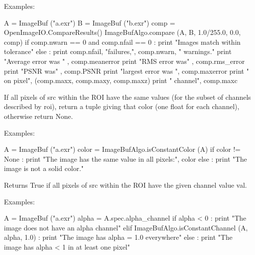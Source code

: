 \smallskip
\noindent Examples:
\begin{code}
    A = ImageBuf ("a.exr")
    B = ImageBuf ("b.exr")
    comp = OpenImageIO.CompareResults()
    ImageBufAlgo.compare (A, B, 1.0/255.0, 0.0, comp)
    if comp.nwarn == 0 and comp.nfail == 0 :
        print "Images match within tolerance"
    else :
        print comp.nfail, "failures,", comp.nwarn, " warnings."
        print "Average error was " , comp.meanerror
        print "RMS error was" , comp.rms_error
        print "PSNR was" , comp.PSNR
        print "largest error was ", comp.maxerror
        print "  on pixel", (comp.maxx, comp.maxy, comp.maxz)
        print "  channel", comp.maxc
\end{code}
\apiend


 

If all pixels of {\cf src} within the ROI have the same values (for the
subset of channels described by {\cf roi}), return a tuple giving that
color (one {\cf float} for each channel), otherwise return {\cf None}.

\smallskip
\noindent Examples:
\begin{code}
    A = ImageBuf ("a.exr")
    color = ImageBufAlgo.isConstantColor (A)
    if color != None :
        print "The image has the same value in all pixels:", color
    else :
        print "The image is not a solid color."
\end{code}
\apiend


 

Returns {\cf True} if all pixels of {\cf src} within the ROI have the
given {\cf channel} value {\cf val}.

\smallskip
\noindent Examples:
\begin{code}
    A = ImageBuf ("a.exr")
    alpha = A.spec.alpha_channel
    if alpha < 0 :
        print "The image does not have an alpha channel"
    elif ImageBufAlgo.isConstantChannel (A, alpha, 1.0) :
        print "The image has alpha = 1.0 everywhere"
    else :
        print "The image has alpha < 1 in at least one pixel"
\end{code}
\apiend


 

